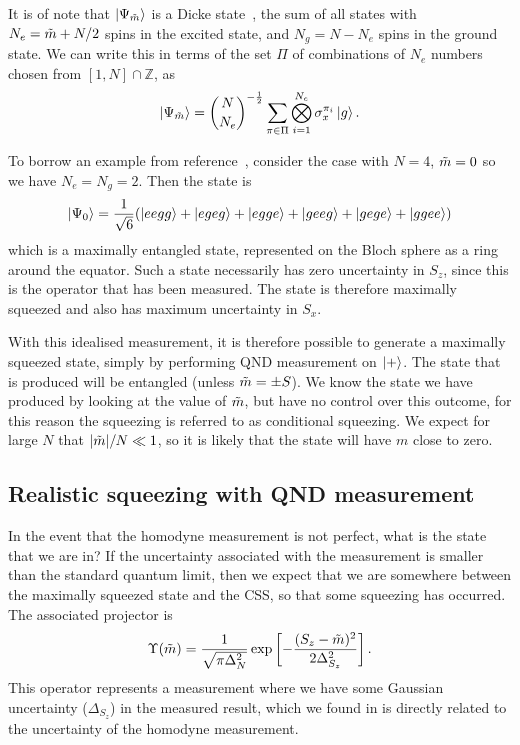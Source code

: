 It is of note that $\ket{\Psi_{\tilde{m}}}$ is a Dicke
state~\cite{Baertschi2019}, the sum of all states with $N_e = \tilde{m} + N/2$
spins in the excited state, and $N_g = N - N_e$ spins in the ground state.  We
can write this in terms of the set $\Pi$ of combinations of $N_e$ numbers
chosen from $[1,N]\cap\mathbb{Z}$, as
%
\begin{equation}
  \ket{\Psi_{\tilde{m}}} = \binom{N}{N_e}^{-\frac{1}{2}}\sum_{\pi \in \Pi}
  \bigotimes_{i=1}^{N_e} \sigma_x^{\pi_i} \ket{g}.
\end{equation}

To borrow an example from reference~\cite{Cox2016}, consider the case with
$N=4$, $\tilde{m}=0$ so we have $N_e = N_g = 2$. Then the state is
%
\begin{equation}
  \ket{\Psi_0} = \frac{1}{\sqrt{6}}(\ket{eegg} + \ket{egeg} + \ket{egge} +
  \ket{geeg} + \ket{gege} + \ket{ggee})
\end{equation}
%
which is a maximally entangled state, represented on the Bloch sphere as a ring
around the equator.
%
Such a state necessarily has zero uncertainty in $S_z$, since this is the
operator that has been measured. The state is therefore maximally squeezed and also
has maximum uncertainty in $S_x$.

With this idealised measurement, it is therefore possible to generate a maximally
squeezed state, simply by performing QND measurement on $\ket{+}$. The state
that is produced will be entangled (unless $\tilde{m} = \pm S$). We know the
state we have produced by looking at the value of $\tilde{m}$, but have no
control over this outcome, for this reason the squeezing is referred to as
conditional squeezing.
%
We expect for large $N$ that $|\tilde{m}|/N \ll 1$, so it is likely that the
state will have $m$ close to zero.

\subsection{Realistic squeezing with QND measurement}

In the event that the homodyne measurement is not perfect, what is the state
that we are in? If the uncertainty associated with the measurement is smaller
than the standard quantum limit, then we expect that we are somewhere between
the maximally squeezed state and the CSS, so that some squeezing has
occurred.
%
The associated projector is~\cite{MAURODARIANO2003205, Vanner16182, Cox2016}
%
\begin{equation}
  \Upsilon(\tilde{m}) = \frac{1}{\sqrt{\pi\Delta_N^2}}\exp\left[
    -\frac{(S_z-\tilde{m})^2}{2\Delta_{S_z}^2}\right].
\end{equation}
%
This operator represents a measurement where we have some Gaussian uncertainty
($\Delta_{S_z}$) in the measured result, which we found in
 is directly related to the uncertainty of the
homodyne measurement.


